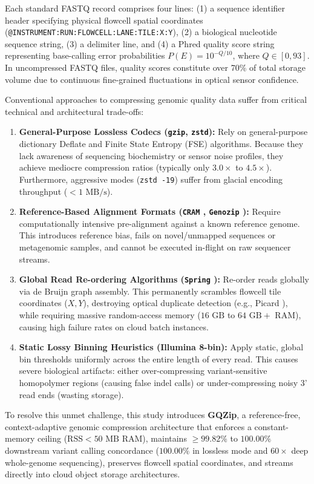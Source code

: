\documentclass[10pt,twocolumn,a4paper]{article}
\begin{document}
Each standard FASTQ record comprises four lines: (1) a sequence identifier header specifying physical flowcell spatial coordinates (\texttt{@INSTRUMENT:RUN:FLOWCELL:LANE:TILE:X:Y}), (2) a biological nucleotide sequence string, (3) a delimiter line, and (4) a Phred quality score string \cite{phred} representing base-calling error probabilities $P(E) = 10^{-Q/10}$, where $Q \in [0, 93]$. In uncompressed FASTQ files, quality scores constitute over 70\% of total storage volume due to continuous fine-grained fluctuations in optical sensor confidence.

Conventional approaches to compressing genomic quality data suffer from critical technical and architectural trade-offs:
\begin{enumerate}
    \item \textbf{General-Purpose Lossless Codecs (\texttt{gzip}, \texttt{zstd}):} Rely on general-purpose dictionary Deflate and Finite State Entropy (FSE) algorithms. Because they lack awareness of sequencing biochemistry or sensor noise profiles, they achieve mediocre compression ratios (typically only $3.0\times$ to $4.5\times$). Furthermore, aggressive modes (\texttt{zstd -19}) suffer from glacial encoding throughput ($<1\text{ MB/s}$).
    \item \textbf{Reference-Based Alignment Formats (\texttt{CRAM} \cite{cram}, \texttt{Genozip} \cite{genozip}):} Require computationally intensive pre-alignment against a known reference genome. This introduces reference bias, fails on novel/unmapped sequences or metagenomic samples, and cannot be executed in-flight on raw sequencer streams.
    \item \textbf{Global Read Re-ordering Algorithms (\texttt{Spring} \cite{spring}):} Re-order reads globally via de Bruijn graph assembly. This permanently scrambles flowcell tile coordinates ($X, Y$), destroying optical duplicate detection (e.g., Picard ), while requiring massive random-access memory ($16\text{ GB}$ to $64\text{ GB}+$ RAM), causing high failure rates on cloud batch instances.
    \item \textbf{Static Lossy Binning Heuristics (Illumina 8-bin):} Apply static, global bin thresholds uniformly across the entire length of every read. This causes severe biological artifacts: either over-compressing variant-sensitive homopolymer regions (causing false indel calls) or under-compressing noisy 3' read ends (wasting storage).
\end{enumerate}

To resolve this unmet challenge, this study introduces \textbf{GQZip}, a reference-free, context-adaptive genomic compression architecture that enforces a constant-memory ceiling ($\text{RSS} < 50\text{ MB}$ RAM), maintains $\ge 99.82\%$ to $100.00\%$ downstream variant calling concordance ($100.00\%$ in lossless mode and $60\times$ deep whole-genome sequencing), preserves flowcell spatial coordinates, and streams directly into cloud object storage architectures.
\end{document}
